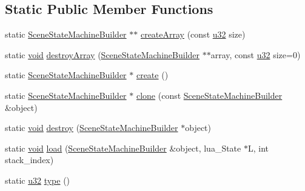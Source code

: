 \subsection*{Static Public Member Functions}
\begin{DoxyCompactItemize}
\item 
static \mbox{\hyperlink{classnjli_1_1_scene_state_machine_builder}{Scene\+State\+Machine\+Builder}} $\ast$$\ast$ \mbox{\hyperlink{classnjli_1_1_scene_state_machine_builder_ae0350a99b5be771c5e981fee2748ca1f}{create\+Array}} (const \mbox{\hyperlink{_util_8h_a10e94b422ef0c20dcdec20d31a1f5049}{u32}} size)
\item 
static \mbox{\hyperlink{_thread_8h_af1e856da2e658414cb2456cb6f7ebc66}{void}} \mbox{\hyperlink{classnjli_1_1_scene_state_machine_builder_a044c8521b552871703df61e526a43b9f}{destroy\+Array}} (\mbox{\hyperlink{classnjli_1_1_scene_state_machine_builder}{Scene\+State\+Machine\+Builder}} $\ast$$\ast$array, const \mbox{\hyperlink{_util_8h_a10e94b422ef0c20dcdec20d31a1f5049}{u32}} size=0)
\item 
static \mbox{\hyperlink{classnjli_1_1_scene_state_machine_builder}{Scene\+State\+Machine\+Builder}} $\ast$ \mbox{\hyperlink{classnjli_1_1_scene_state_machine_builder_aea2b1500804bee4d04c625f16f0b83b3}{create}} ()
\item 
static \mbox{\hyperlink{classnjli_1_1_scene_state_machine_builder}{Scene\+State\+Machine\+Builder}} $\ast$ \mbox{\hyperlink{classnjli_1_1_scene_state_machine_builder_ac50a3efc74db66ef90683651cf1f9a8d}{clone}} (const \mbox{\hyperlink{classnjli_1_1_scene_state_machine_builder}{Scene\+State\+Machine\+Builder}} \&object)
\item 
static \mbox{\hyperlink{_thread_8h_af1e856da2e658414cb2456cb6f7ebc66}{void}} \mbox{\hyperlink{classnjli_1_1_scene_state_machine_builder_a702e8dc5d3aa03f19fd59420c3a8e662}{destroy}} (\mbox{\hyperlink{classnjli_1_1_scene_state_machine_builder}{Scene\+State\+Machine\+Builder}} $\ast$object)
\item 
static \mbox{\hyperlink{_thread_8h_af1e856da2e658414cb2456cb6f7ebc66}{void}} \mbox{\hyperlink{classnjli_1_1_scene_state_machine_builder_a3429901daf45bf8649b8157804abe8a9}{load}} (\mbox{\hyperlink{classnjli_1_1_scene_state_machine_builder}{Scene\+State\+Machine\+Builder}} \&object, lua\+\_\+\+State $\ast$L, int stack\+\_\+index)
\item 
static \mbox{\hyperlink{_util_8h_a10e94b422ef0c20dcdec20d31a1f5049}{u32}} \mbox{\hyperlink{classnjli_1_1_scene_state_machine_builder_abdae2a2e543b6c7d76de85efb832510f}{type}} ()
\end{DoxyCompactItemize}
